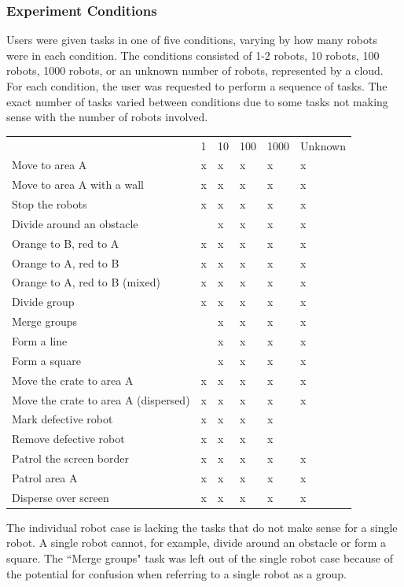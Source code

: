\subsubsection{Experiment Conditions}

Users were given tasks in one of five conditions, varying by how many robots were in each condition. 
The conditions consisted of 1-2 robots, 10 robots, 100 robots, 1000 robots, or an unknown number of robots, represented by a cloud. 
For each condition, the user was requested to perform a sequence of tasks. 
The exact number of tasks varied between conditions due to some tasks not making sense with the number of robots involved. 

\begin{tabular}{l|l|l|l|l|l}
& 1 & 10 & 100 & 1000 & Unknown \\
Move to area A & x & x & x & x & x\\
Move to area A with a wall & x & x & x & x & x \\
Stop the robots & x & x & x & x & x\\
Divide around an obstacle & & x & x & x & x \\
Orange to B, red to A & x & x & x & x & x \\
Orange to A, red to B & x & x & x & x & x \\
Orange to A, red to B (mixed) & x & x & x & x & x \\
Divide group & x & x & x & x & x \\
Merge groups & & x & x & x & x \\
Form a line & & x & x & x & x \\
Form a square & & x & x & x & x \\
Move the crate to area A & x & x & x & x & x \\
Move the crate to area A (dispersed) & x & x & x & x & x\\
Mark defective robot & x & x & x & x & \\
Remove defective robot & x & x & x & x &  \\
Patrol the screen border & x & x & x & x & x \\
Patrol area A & x & x & x & x & x \\
Disperse over screen & x & x & x & x & x \\
\end{tabular}

The individual robot case is lacking the tasks that do not make sense for a single robot. A single robot cannot, for example, divide around an obstacle or form a square. 
The ``Merge groups" task was left out of the single robot case because of the potential for confusion when referring to a single robot as a group. 

